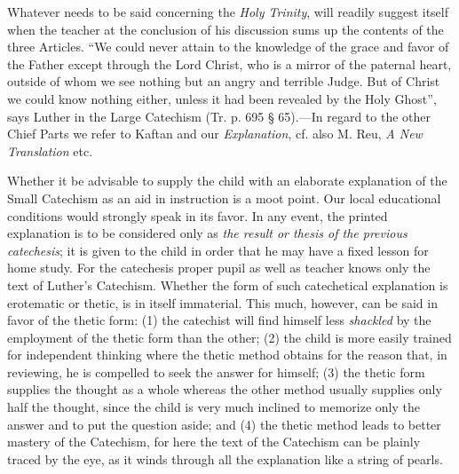 Whatever needs to be said concerning the \emph{Holy Trinity}, will readily suggest itself when the teacher at the conclusion of his discussion sums up the contents of the three Articles. “We could never attain to the knowledge of the grace and favor of the Father except through the Lord Christ, who is a mirror of the paternal heart, outside of whom we see nothing but an angry and terrible Judge. But of Christ we could know nothing either, unless it had been revealed by the Holy Ghost”, says Luther in the Large Catechism (Tr. p. 695 § 65).—In regard to the other Chief Parts we refer to Kaftan and our \emph{Explanation}, cf. also M. Reu, \emph{A New Translation} etc.

Whether it be advisable to supply the child with an elaborate explanation of the Small Catechism as an aid in instruction is a moot point. Our local educational conditions would strongly speak in its favor. In any event, the printed explanation is to be considered only as \emph{the result or thesis of the previous catechesis}; it is given to the child in order that he may have a fixed lesson for home study. For the catechesis proper pupil as well as teacher knows only the text of Luther’s Catechism. Whether the form of such catechetical explanation is erotematic or thetic, is in itself immaterial. This much, however, can be said in favor of the thetic form: (1) the catechist will find himself less \emph{shackled} by the employment of the thetic form than the other; (2) the child is more easily trained for independent thinking where the thetic method obtains for the reason that, in reviewing, he is compelled to seek the answer for himself; (3) the thetic form supplies the thought as a whole whereas the other method usually supplies only half the thought, since the child is very much inclined to memorize only the answer and to put the question aside; and (4) the thetic method leads to better mastery of the Catechism, for here the text of the Catechism can be plainly traced by the eye, as it winds through all the explanation like a string of pearls.
